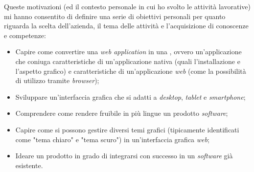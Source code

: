 Queste motivazioni (ed il contesto personale in cui ho svolto le attività lavorative) mi hanno consentito di definire una serie di obiettivi personali per quanto riguarda la scelta dell'azienda, il tema delle attività e l'acquisizione di conoscenze e competenze:
\begin{itemize}
    \item Capire come convertire una \textit{web application} in una , ovvero un'applicazione che coniuga caratteristiche di un'applicazione nativa (quali l'installazione e l'aspetto grafico) e caratteristiche di un'applicazione \textit{web} (come la possibilità di utilizzo tramite \textit{browser});
    \item Sviluppare un'interfaccia grafica che si adatti a \textit{desktop}, \textit{tablet} e \textit{smartphone};
    \item Comprendere come rendere fruibile in più lingue un prodotto \textit{software};
    \item Capire come si possono gestire diversi temi grafici (tipicamente identificati come "tema chiaro" e "tema scuro") in un'interfaccia grafica \textit{web};
    \item Ideare un prodotto in grado di integrarsi con successo in un \textit{software} già esistente.
\end{itemize}